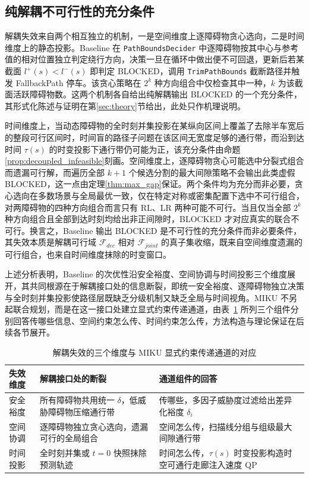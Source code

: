 \documentclass[a4paper,11pt]{ctexart}
\theoremstyle{definition}
\begin{document}
\subsection{纯解耦不可行性的充分条件}
\label{subsec:infeasibility_condition}

解耦失效来自两个相互独立的机制，一是空间维度上逐障碍物贪心选向，二是时间维度上的静态投影。Baseline 在 \texttt{PathBoundsDecider} 中逐障碍物按其中心与参考值的相对位置独立判定绕行方向，决策一旦在循环中做出便不可回退，更新后若某截面 $l^{+}(s) < l^{-}(s)$ 即判定 BLOCKED，调用 \texttt{TrimPathBounds} 截断路径并触发 FallbackPath 停车。该贪心策略在 $2^k$ 种方向组合中仅检查其中一种，$k$ 为该截面活跃障碍物数。这两个机制各自给出纯解耦输出 BLOCKED 的一个充分条件，其形式化陈述与证明在第\ref{sec:theory}节给出，此处只作机理说明。

时间维度上，当动态障碍物的全时刻并集投影在某纵向区间上覆盖了去除半车宽后的整段可行区间时，时间盲的路径子问题在该区间无宽度足够的通行带，而沿到达时间 $\tau(s)$ 的时变投影下通行带仍可能为正，该充分条件由命题\ref{prop:decoupled_infeasible}刻画。空间维度上，逐障碍物贪心可能选中分裂式组合而遗漏可行解，而遍历全部 $k+1$ 个候选分割的最大间隙策略不会输出此类虚假 BLOCKED，这一点由定理\ref{thm:max_gap}保证。两个条件均为充分而非必要，贪心选向在多数场景与全局最优一致，仅在特定对称或密集配置下选中不可行组合，对两障碍物的四种方向组合而言只有 RL、LR 两种可能不可行。当且仅当全部 $2^k$ 种方向组合且全部到达时刻均给出非正间隙时，BLOCKED 才对应真实的联合不可行。换言之，Baseline 输出 BLOCKED 是不可行性的充分条件而非必要条件，其失效本质是解耦可行域 $\mathcal{F}_{dec}$ 相对 $\mathcal{F}_{joint}$ 的真子集收缩，既来自空间维度遗漏的可行组合，也来自时间维度抹除的时变窗口。

上述分析表明，Baseline 的次优性沿安全裕度、空间协调与时间投影三个维度展开，其共同根源在于解耦接口处的信息断裂，即统一安全裕度、逐障碍物独立决策与全时刻并集投影使路径层既缺乏分级机制又缺乏全局与时间视角。MIKU 不另起联合规划，而是在这一接口处建立显式约束传递通道，由表~\ref{tab:prob_channel} 所列三个组件分别回答传哪些信息、空间约束怎么传、时间约束怎么传，方法构造与理论保证在后续各节展开。

\begin{table}[htbp]
\centering
\caption{解耦失效的三个维度与 MIKU 显式约束传递通道的对应}
\label{tab:prob_channel}
\begin{tabular}{p{2.4cm} p{4.6cm} p{4.6cm}}
\hline
失效维度 & 解耦接口处的断裂 & 通道组件的回答 \\
\hline
安全裕度 & 所有障碍物共用统一 $\delta$，低威胁障碍物压缩通行带 & 传哪些，多因子威胁度过滤给出差异化裕度 $\delta_i$ \\
空间协调 & 逐障碍物独立贪心选向，遗漏可行的全局组合 & 空间怎么传，扫描线分组与组级最大间隙通行带 \\
时间投影 & 全时刻并集或 $t{=}0$ 快照抹除预测轨迹 & 时间怎么传，$\tau(s)$ 时变投影构造时空可通行走廊注入速度 QP \\
\hline
\end{tabular}
\end{table}
\end{document}
